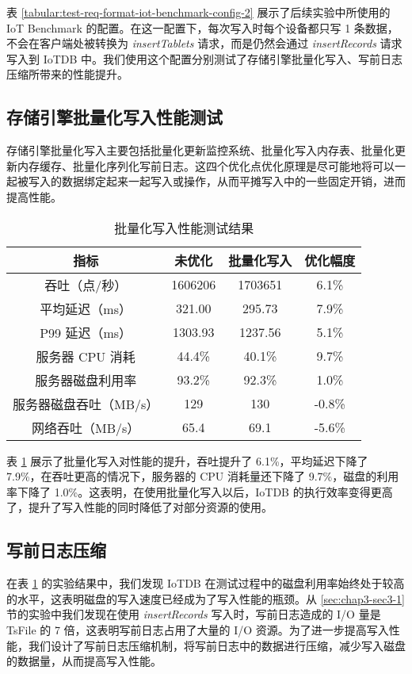 表 \ref{tabular:test-req-format-iot-benchmark-config-2} 展示了后续实验中所使用的 IoT Benchmark 的配置。在这一配置下，每次写入时每个设备都只写 1 条数据，不会在客户端处被转换为 \emph{insertTablets} 请求，而是仍然会通过 \emph{insertRecords} 请求写入到 IoTDB 中。我们使用这个配置分别测试了存储引擎批量化写入、写前日志压缩所带来的性能提升。
\subsection{存储引擎批量化写入性能测试}
存储引擎批量化写入主要包括批量化更新监控系统、批量化写入内存表、批量化更新内存缓存、批量化序列化写前日志。这四个优化点优化原理是尽可能地将可以一起被写入的数据绑定起来一起写入或操作，从而平摊写入中的一些固定开销，进而提高性能。
\begin{table}
  \centering
  \caption{批量化写入性能测试结果}
  \begin{tabular}{cccc}
    \toprule 
    指标 & 未优化 & 批量化写入 & 优化幅度 \\ 
    \midrule
    吞吐（点/秒） & 1606206 & 1703651 & 6.1\%\\
    平均延迟（ms） & 321.00 & 295.73 & 7.9\%\\
    P99 延迟（ms） & 1303.93 & 1237.56 & 5.1\% \\
    服务器 CPU 消耗 & 44.4\% & 40.1\% & 9.7\%\\
    服务器磁盘利用率 & 93.2\% & 92.3\% & 1.0\%\\
    服务器磁盘吞吐（MB/s） & 129 & 130 & -0.8\% \\
    网络吞吐（MB/s） & 65.4 & 69.1 & -5.6\%\\
    \bottomrule 
  \end{tabular}
  \label{tabular:batch-write-performance}
\end{table}

表 \ref{tabular:batch-write-performance} 展示了批量化写入对性能的提升，吞吐提升了 6.1\%，平均延迟下降了 7.9\%，在吞吐更高的情况下，服务器的 CPU 消耗量还下降了 9.7\%，磁盘的利用率下降了 1.0\%。这表明，在使用批量化写入以后，IoTDB 的执行效率变得更高了，提升了写入性能的同时降低了对部分资源的使用。

\subsection{写前日志压缩}
在表 \ref{tabular:batch-write-performance} 的实验结果中，我们发现 IoTDB 在测试过程中的磁盘利用率始终处于较高的水平，这表明磁盘的写入速度已经成为了写入性能的瓶颈。从 \ref{sec:chap3-sec3-1} 节的实验中我们发现在使用 \emph{insertRecords} 写入时，写前日志造成的 I/O 量是 TsFile 的 7 倍，这表明写前日志占用了大量的 I/O 资源。为了进一步提高写入性能，我们设计了写前日志压缩机制，将写前日志中的数据进行压缩，减少写入磁盘的数据量，从而提高写入性能。

